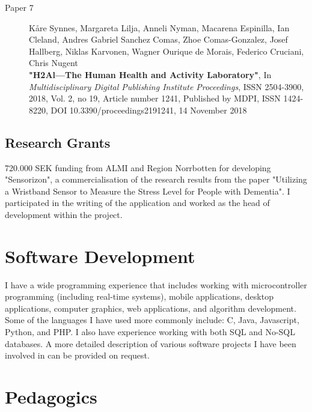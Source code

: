 \documentclass{article}
\begin{document}
\begin{description}
\item[Paper 7]
Kåre Synnes, Margareta Lilja, Anneli Nyman, Macarena Espinilla, Ian Cleland, Andres Gabriel Sanchez Comas, Zhoe Comas-Gonzalez, Josef Hallberg, Niklas Karvonen, Wagner Ourique de Morais, Federico Cruciani, Chris Nugent\\
{\bf "H2Al—The Human Health and Activity Laboratory"}, 
In {\it Multidisciplinary Digital Publishing Institute Proceedings}, ISSN 2504-3900, 2018, Vol. 2, no 19, Article number 1241,
Published by MDPI, ISSN 1424-8220,
DOI 10.3390/proceedings2191241,
14 November 2018
\end{description}

\subsection{Research Grants}
720.000 SEK funding from ALMI and Region Norrbotten for developing "Sensorizon", a commercialisation of the research results from the paper "Utilizing a Wristband Sensor to Measure the Stress Level for People with Dementia". I participated in the writing of the application and worked as the head of development within the project.



\newpage

\section{Software Development}
I have a wide programming experience that includes working with microcontroller programming (including real-time systems), mobile applications, desktop applications, computer graphics, web applications, and algorithm development. Some of the languages I have used more commonly include: C, Java, Javascript, Python, and PHP. I also have experience working with both SQL and No-SQL databases. A more detailed description of various software projects I have been involved in can be provided on request.

\section{Pedagogics}
\end{document}
